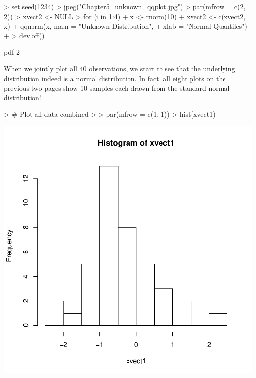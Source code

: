 \documentclass[12pt,letterpaper,final]{article}
\begin{document}
\begin{Schunk}
\begin{Sinput}
> set.seed(1234)
> jpeg("Chapter5_unknown_qqplot.jpg")
> par(mfrow = c(2, 2))
> xvect2 <- NULL
> for (i in 1:4) {
+   x <- rnorm(10)
+   xvect2 <- c(xvect2, x)
+   qqnorm(x, main = "Unknown Distribution",
+     xlab = "Normal Quantiles")
+ }
> dev.off()
\end{Sinput}
\begin{Soutput}
pdf 
  2 
\end{Soutput}
\end{Schunk}


\newpage


When we jointly plot all 40 observations, we start
to see that the underlying distribution indeed is a
normal distribution. In fact, all eight plots 
on the previous two pages show
10 samples each drawn from the standard normal distribution!

\begin{Schunk}
\begin{Sinput}
> # Plot all data combined
> 
> par(mfrow = c(1, 1))
> hist(xvect1)
\end{Sinput}
\end{Schunk}
\includegraphics{lect_main-040}
\end{document}
